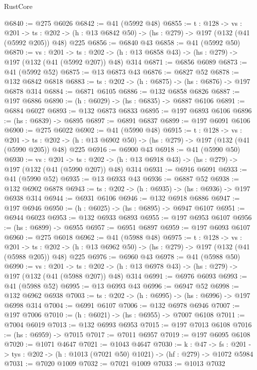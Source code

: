 \begin{lexlean}{RustCore}
\begin{coremodule}
@6840 := @275 @6026
@6842 := @41 (@5992 @48)
@6855 := {t : @128} ->
  {vs : @201} ->
  {ts : @202} -> (h : @13 @6842 @50) -> (hs : @279) -> @197 (@132 (@41 (@5992 @205)) @48) @225
@6856 := @6840 @43
@6858 := @41 (@5992 @50)
@6870 := {vs : @201} ->
  {ts : @202} -> (h : @13 @6858 @43) -> (hs : @279) -> @197 (@132 (@41 (@5992 @207)) @48) @314
@6871 := @6856 @6089
@6873 := @41 (@5992 @52)
@6875 := @13 @6873 @43
@6876 := @6827 @52
@6878 := @132 @6842 @6818
@6883 := {ts : @202} -> (h : @6875) -> (hs : @6876) -> @197 @6878 @314
@6884 := @6871 @6105
@6886 := @132 @6858 @6826
@6887 := @197 @6886
@6890 := (h : @6029) -> (hs : @6835) -> @6887 @6106
@6891 := @6884 @6027
@6893 := @132 @6873 @6833
@6895 := @197 @6893 @6106
@6896 := (hs : @6839) -> @6895
@6897 := @6891 @6837
@6899 := @197 @6091 @6106
@6900 := @275 @6022
@6902 := @41 (@5990 @48)
@6915 := {t : @128} ->
  {vs : @201} ->
  {ts : @202} -> (h : @13 @6902 @50) -> (hs : @279) -> @197 (@132 (@41 (@5990 @205)) @48) @225
@6916 := @6900 @43
@6918 := @41 (@5990 @50)
@6930 := {vs : @201} ->
  {ts : @202} -> (h : @13 @6918 @43) -> (hs : @279) -> @197 (@132 (@41 (@5990 @207)) @48) @314
@6931 := @6916 @6091
@6933 := @41 (@5990 @52)
@6935 := @13 @6933 @43
@6936 := @6887 @52
@6938 := @132 @6902 @6878
@6943 := {ts : @202} -> (h : @6935) -> (hs : @6936) -> @197 @6938 @314
@6944 := @6931 @6106
@6946 := @132 @6918 @6886
@6947 := @197 @6946
@6950 := (h : @6025) -> (hs : @6895) -> @6947 @6107
@6951 := @6944 @6023
@6953 := @132 @6933 @6893
@6955 := @197 @6953 @6107
@6956 := (hs : @6899) -> @6955
@6957 := @6951 @6897
@6959 := @197 @6093 @6107
@6960 := @275 @6018
@6962 := @41 (@5988 @48)
@6975 := {t : @128} ->
  {vs : @201} ->
  {ts : @202} -> (h : @13 @6962 @50) -> (hs : @279) -> @197 (@132 (@41 (@5988 @205)) @48) @225
@6976 := @6960 @43
@6978 := @41 (@5988 @50)
@6990 := {vs : @201} ->
  {ts : @202} -> (h : @13 @6978 @43) -> (hs : @279) -> @197 (@132 (@41 (@5988 @207)) @48) @314
@6991 := @6976 @6093
@6993 := @41 (@5988 @52)
@6995 := @13 @6993 @43
@6996 := @6947 @52
@6998 := @132 @6962 @6938
@7003 := {ts : @202} -> (h : @6995) -> (hs : @6996) -> @197 @6998 @314
@7004 := @6991 @6107
@7006 := @132 @6978 @6946
@7007 := @197 @7006
@7010 := (h : @6021) -> (hs : @6955) -> @7007 @6108
@7011 := @7004 @6019
@7013 := @132 @6993 @6953
@7015 := @197 @7013 @6108
@7016 := (hs : @6959) -> @7015
@7017 := @7011 @6957
@7019 := @197 @6095 @6108
@7020 := @1071 @4647
@7021 := @1043 @4647
@7030 := {k : @47} ->
  {fs : @201} -> {tys : @202} -> (h : @1013 (@7021 @50) @1021) -> (hf : @279) -> @1072 @5984
@7031 := @7020 @1009
@7032 := @7021 @1009
@7033 := @1013 @7032

\end{coremodule}
\end{lexlean}
